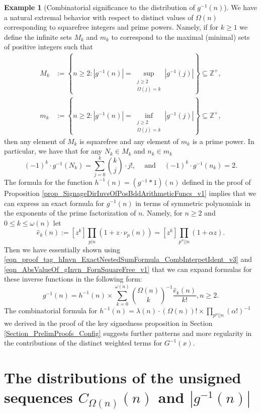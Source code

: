 \documentclass[11pt,reqno,a4letter]{article}
\numberwithin{figure}{section}
\numberwithin{table}{section}
\theoremstyle{plain}
\numberwithin{theorem}{section}
\theoremstyle{definition}
\newtheorem{example}[theorem]{Example}
\begin{document}
\begin{example}[Combinatorial significance to the distribution of $g^{-1}(n)$] 
We have a natural extremal behavior with respect to distinct values of $\Omega(n)$ 
corresponding to squarefree integers and prime powers. Namely, if for $k \geq 1$ we define the 
infinite sets $M_k$ and $m_k$ to correspond to the maximal (minimal) sets of 
positive integers such that 
\begin{align*} 
M_k & := \left\{n \geq 2: |g^{-1}(n)| = \underset{{\substack{j \geq 2 \\ \Omega(j) = k}}}{\operatorname{sup}} 
     |g^{-1}(j)|\right\} \subseteq \mathbb{Z}^{+}, \\  
m_k & := \left\{n \geq 2: |g^{-1}(n)| = \underset{{\substack{j \geq 2 \\ \Omega(j) = k}}}{\operatorname{inf}} 
     |g^{-1}(j)|\right\} \subseteq \mathbb{Z}^{+}, 
\end{align*} 
then any element of $M_k$ is squarefree and any element of $m_k$ is a prime power. 
In particular, we have that for any $N_k \in M_k$ and $n_k \in m_k$
\[
(-1)^{k} \cdot g^{-1}(N_k) = \sum_{j=0}^{k} \binom{k}{j} \cdot j!, 
     \quad \mathrm{\ and\ } \quad 
     (-1)^{k} \cdot g^{-1}(n_k) = 2. 
\]
The formula for the function $h^{-1}(n) = (g^{-1} \ast 1)(n)$ defined in the proof of 
Proposition \ref{prop_SignageDirInvsOfPosBddArithmeticFuncs_v1} implies that we can express 
an exact formula for $g^{-1}(n)$ in terms of symmetric polynomials in the 
exponents of the prime factorization of $n$. 
Namely, for $n \geq 2$ and $0 \leq k \leq \omega(n)$ let 
\[
\widehat{e}_k(n) := [z^k] \prod_{p|n} (1 + z \cdot \nu_p(n)) = [z^k] \prod_{p^{\alpha} || n} (1 + \alpha z). 
\]
Then we have essentially shown using 
\eqref{eqn_proof_tag_hInvn_ExactNestedSumFormula_CombInterpetIdent_v3} and 
\eqref{eqn_AbsValueOf_gInvn_FornSquareFree_v1} that we can expand formulas for 
these inverse functions in the following form: 
\[
g^{-1}(n) = h^{-1}(n) \times \sum_{k=0}^{\omega(n)} \binom{\Omega(n)}{k}^{-1} 
     \frac{\widehat{e}_k(n)}{k!}, n \geq 2. 
\]
The combinatorial formula for 
$h^{-1}(n) = \lambda(n) \cdot (\Omega(n))! \times \prod_{p^{\alpha} || n} (\alpha !)^{-1}$ 
we derived in the proof of the key signedness proposition in 
Section \ref{Section_PrelimProofs_Config} 
suggests further patterns and more regularity in the contributions of the distinct weighted 
terms for $G^{-1}(x)$. 
\end{example} 

\newpage
\section{The distributions of the unsigned sequences 
         $C_{\Omega(n)}(n)$ and $|g^{-1}(n)|$} 
\label{Section_NewFormulasForgInvn} 
\end{document}
